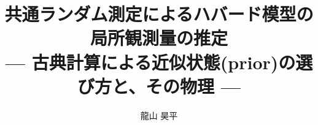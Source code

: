 \documentclass[11pt,a4paper,openany]{ltjsreport}
\title{\bfseries 共通ランダム測定によるハバード模型の局所観測量の推定\\[4pt]
\large — 古典計算による近似状態(prior)の選び方と、その物理 —}
\author{龍山 昊平}
\date{\todo{提出年月}}
\begin{document}
\maketitle

\begin{abstract}

\end{abstract}

\tableofcontents










\appendix





\end{document}
